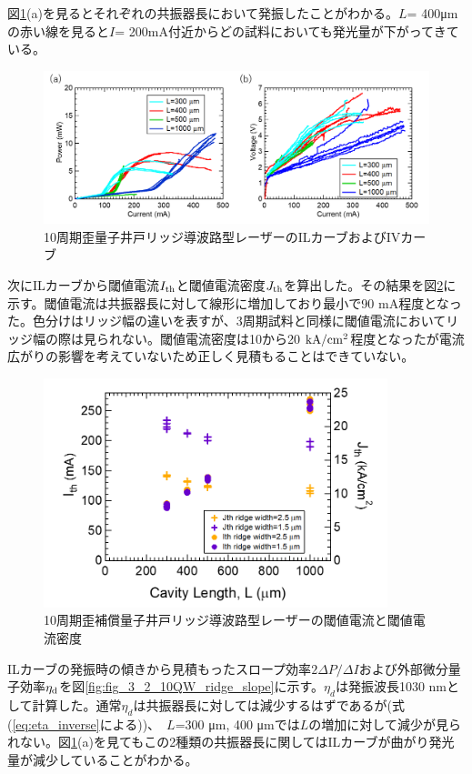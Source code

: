{図\ref{fig:fig_3_2_10QW_ridge_IL}(a)を見るとそれぞれの共振器長において発振したことがわかる。$L$= 400\si{\micro\metre}の赤い線を見ると$I$= 200mA付近からどの試料においても発光量が下がってきている。
\begin{figure}[h]
	\centering
	\includegraphics[width=15cm]{figure/fig_3_2_10QW_ridge_IL.png}
		\caption{10周期歪量子井戸リッジ導波路型レーザーのILカーブおよびIVカーブ}
		\label{fig:fig_3_2_10QW_ridge_IL}
\end{figure}
次にILカーブから閾値電流$I_{\rm{th}}$と閾値電流密度$J_{\rm{th}}$を算出した。その結果を図\ref{fig:fig_3_2_10QW_ridge_Ith}に示す。閾値電流は共振器長に対して線形に増加しており最小で90 mA程度となった。色分けはリッジ幅の違いを表すが、3周期試料と同様に閾値電流においてリッジ幅の際は見られない。閾値電流密度は10から20 $\rm{kA/cm^{2}}$程度となったが電流広がりの影響を考えていないため正しく見積もることはできていない。
\begin{figure}[h]
	\centering
	\includegraphics[width=10cm]{figure/fig_3_2_10QW_ridge_Ith.png}
		\caption{10周期歪補償量子井戸リッジ導波路型レーザーの閾値電流と閾値電流密度}
		\label{fig:fig_3_2_10QW_ridge_Ith}
\end{figure}
ILカーブの発振時の傾きから見積もったスロープ効率$2\Delta P/\Delta I$および外部微分量子効率$\eta_{\rm{d}}$を図\ref{fig:fig_3_2_10QW_ridge_slope}に示す。$\eta_{d}$は発振波長1030 nmとして計算した。通常$\eta_{d}$は共振器長に対しては減少するはずであるが(式(\ref{eq:eta_inverse}による))、　$L$=300 \si{\micro\metre},  400  \si{\micro\metre}では$L$の増加に対して減少が見られない。図\ref{fig:fig_3_2_10QW_ridge_IL}(a)を見てもこの2種類の共振器長に関してはILカーブが曲がり発光量が減少していることがわかる。


}
